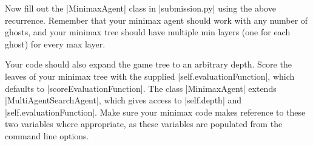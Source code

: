 \item {}

Now fill out the |MinimaxAgent| class in |submission.py| using the above
recurrence. Remember that your minimax agent should work with any number of
ghosts, and your minimax tree should have multiple min layers (one for each
ghost) for every max layer.

Your code should also expand the game tree to an arbitrary depth. Score the
leaves of your minimax tree with the supplied |self.evaluationFunction|, which
defaults to |scoreEvaluationFunction|. The class |MinimaxAgent| extends
|MultiAgentSearchAgent|, which gives access to |self.depth| and
|self.evaluationFunction|. Make sure your minimax code makes reference to these
two variables where appropriate, as these variables are populated from the
command line options.


